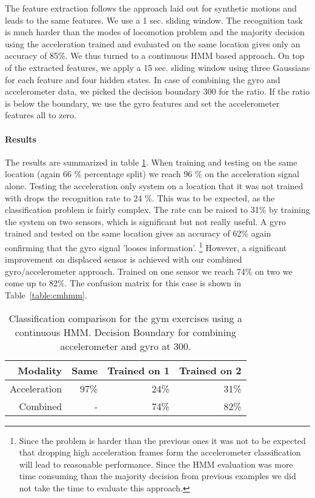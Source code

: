 The feature extraction follows the approach laid out for synthetic
motions and leads to the same features. We use a 1 sec.
sliding window.
The recognition task is much harder than the modes of locomotion
problem and the  majority decision using the acceleration trained and
evaluated on the same location gives only  an accuracy of 85\%. We
thus turned to a continuous HMM based approach.
On top of the extracted features, we apply a 
15 sec. sliding window using three Gaussians for each feature and four hidden states.
In case of combining the gyro and accelerometer data, we picked the decision boundary 
300 for the ratio. If the ratio is below the boundary, we use the gyro
features and set the accelerometer
 features all to zero.
 
\paragraph{Results} 
The results are summarized in table \ref{tab:clemens}.  
When training and testing on the same location (again 66 \% percentage
split) we reach 96 \% on the acceleration signal alone. Testing the
acceleration only system on a location that it was not trained with
drops the recognition rate to 24 \%. This was to be expected, as the
classification problem is fairly complex. The rate can be raised to
31\% by training the system on two sensors, which is significant but not
really useful.  
A gyro trained and tested on the same location gives an accuracy of
62\% again confirming that the gyro signal 'looses information'.
\footnote{Since the problem is harder than the previous ones it was not to be
expected that dropping high acceleration frames form the accelerometer
classification  will lead to reasonable performance. Since the HMM
evaluation was more time consuming than the majority decision from
previous examples we did not take the time to evaluate this approach.}
 However, a  significant improvement on displaced sensor is achieved with
 our combined gyro/accelerometer approach. Trained on one sensor  we
 reach 74\% on two we come up to 82\%.  The confusion matrix for this
 case is shown in Table~\ref{table:cmhmm}.
\begin{table}
\centering
\caption[Classification comparison for gym]{Classification comparison for the gym exercises using a continuous
HMM. Decision Boundary for combining accelerometer and gyro at 300. }
\centering
\begin{tabular}{rrrr}
\toprule
Modality& Same& Trained on 1& Trained on 2\\\midrule
Acceleration& 97\%& 24\%&	 31\%\\
Combined & -& 74\%& 82\%\\
\bottomrule
\end{tabular}%
\label{tab:clemens}
\end{table}


